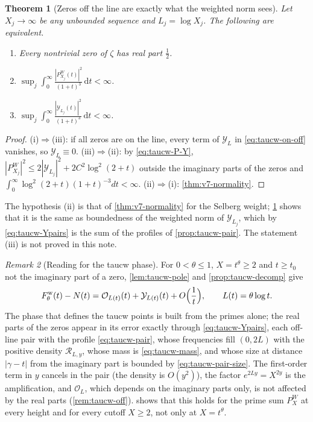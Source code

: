 \documentclass[11pt,a4paper]{article}
\numberwithin{equation}{section}
\newtheorem{theorem}{Theorem}[section]
\theoremstyle{definition}
\theoremstyle{remark}
\newtheorem{remark}[theorem]{Remark}
\newcommand{\dd}{\,\mathrm dt}
\begin{document}
\begin{theorem}[Zeros off the line are exactly what the weighted norm sees]\label{thm:taucw-equiv}
Let $X_j\to\infty$ be any unbounded sequence and $L_j=\log X_j$. The following are equivalent.
\begin{enumerate}[label=(\roman*),leftmargin=*]
\item Every nontrivial zero of $\zeta$ has real part $\frac12$.
\item $\displaystyle\sup_j\int_0^\infty\frac{|P^W_{X_j}(t)|^2}{(1+t)^3}\dd<\infty$.
\item $\displaystyle\sup_j\int_0^\infty\frac{|\mathcal Y_{L_j}(t)|^2}{(1+t)^3}\dd<\infty$.
\end{enumerate}
\end{theorem}
\begin{proof}
(i)$\Rightarrow$(iii): if all zeros are on the line, every term of $\mathcal Y_L$ in \eqref{eq:taucw-on-off} vanishes, so $\mathcal Y_{L}\equiv0$. (iii)$\Rightarrow$(ii): by \eqref{eq:taucw-P-Y}, $|P^W_{X_j}|^2\le2|\mathcal Y_{L_j}|^2+2C^2\log^2(2+t)$ outside the imaginary parts of the zeros and $\int_0^\infty\log^2(2+t)(1+t)^{-3}dt<\infty$. (ii)$\Rightarrow$(i): \cref{thm:v7-normality}.
\end{proof}
The hypothesis (ii) is that of \cref{thm:v7-normality} for the Selberg weight; \cref{thm:taucw-equiv} shows that it is the same as boundedness of the weighted norm of $\mathcal Y_{L_j}$, which by \eqref{eq:taucw-Ypairs} is the sum of the profiles of \cref{prop:taucw-pair}. The statement (iii) is not proved in this note.

\begin{remark}[Reading for the taucw phase]\label{rem:taucw-detect}
For $0<\theta\le1$, $X=t^\theta\ge2$ and $t\ge t_0$ not the imaginary part of a zero, \cref{lem:taucw-pole} and \cref{prop:taucw-decomp} give
\begin{equation}
F^{\mathrm w}_\theta(t)-N(t)=\mathcal O_{L(t)}(t)+\mathcal Y_{L(t)}(t)+O\Bigl(\frac1t\Bigr),\qquad L(t)=\theta\log t .
\end{equation}
The phase that defines the taucw points is built from the primes alone; the real parts of the zeros appear in its error exactly through \eqref{eq:taucw-Ypairs}, each off-line pair with the profile \eqref{eq:taucw-pair}, whose frequencies fill $(0,2L)$ with the positive density $\mathscr R_{L,y}$, whose mass is \eqref{eq:taucw-mass}, and whose size at distance $|\gamma-t|$ from the imaginary part is bounded by \eqref{eq:taucw-pair-size}. The first-order term in $y$ cancels in the pair (the density is $O(y^2)$), the factor $e^{2Ly}=X^{2y}$ is the amplification, and $\mathcal O_L$, which depends on the imaginary parts only, is not affected by the real parts (\cref{rem:taucw-off}).  shows that this holds for the prime sum $P^W_X$ at every height and for every cutoff $X\ge2$, not only at $X=t^\theta$.
\end{remark}
\end{document}
